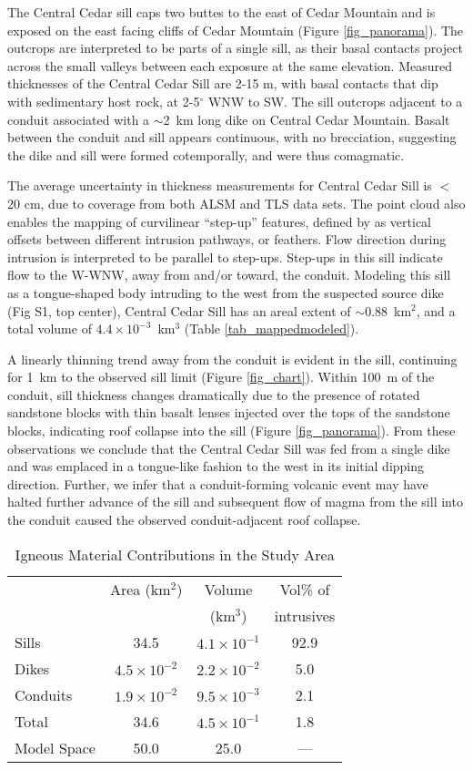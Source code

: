 The Central Cedar sill caps two buttes to the east of Cedar Mountain and is exposed on the east facing cliffs of Cedar Mountain (Figure \ref{fig_panorama}). The outcrops are interpreted to be parts of a single sill, as their basal contacts project across the small valleys between each exposure at the same elevation. Measured thicknesses of the Central Cedar Sill are 2-15 m, with basal contacts that dip with sedimentary host rock, at 2-5$^{\circ}$ WNW to SW. The sill outcrops adjacent to a conduit associated with a $\sim$2~km long dike on Central Cedar Mountain. Basalt between the conduit and sill appears continuous, with no brecciation, suggesting the dike and sill were formed cotemporally, and were thus comagmatic.

The average uncertainty in thickness measurements for Central Cedar Sill is $<$20 cm, due to coverage from both ALSM and TLS data sets. The point cloud also enables the mapping of curvilinear ``step-up'' features, defined by \citet{gartner1986geometry} as vertical offsets between different intrusion pathways, or feathers. Flow direction during intrusion is interpreted to be parallel to step-ups. Step-ups in this sill indicate flow to the W-WNW, away from and/or toward, the conduit. Modeling this sill as a tongue-shaped body intruding to the west from the suspected source dike (Fig S1, top center), Central Cedar Sill has an areal extent of $\sim$0.88~km$^2$, and a total volume of $4.4\times 10^{-3}$~km$^3$ (Table \ref{tab_mappedmodeled}).

A linearly thinning trend away from the conduit is evident in the sill, continuing for 1~km to the observed sill limit (Figure \ref{fig_chart}). Within 100~m of the conduit, sill thickness changes dramatically due to the presence of rotated sandstone blocks with thin basalt lenses injected over the tops of the sandstone blocks, indicating roof collapse into the sill (Figure \ref{fig_panorama}). From these observations we conclude that the Central Cedar Sill was fed from a single dike and was emplaced in a tongue-like fashion to the west in its initial dipping direction. Further, we infer that a conduit-forming volcanic event may have halted further advance of the sill and subsequent flow of magma from the sill into the conduit caused the observed conduit-adjacent roof collapse.

\begin{table}
\centering
\caption{Igneous Material Contributions in the Study Area}
\begin{tabular}{l c c c}
\toprule
 & Area (km$^2$) & Volume  & Vol\% of  \\
 & & (km$^3$) & intrusives \\
\midrule
 Sills & 34.5 & $4.1 \times 10^{-1}$ & 92.9 \\ 
 Dikes & $4.5 \times 10^{-2}$ & $2.2 \times 10^{-2}$ & 5.0 \\
 Conduits & $1.9 \times 10^{-2}$ & $9.5 \times 10^{-3}$ & 2.1 \\
 Total & 34.6 & $4.5 \times 10^{-1}$ & 1.8 \\
 Model Space & 50.0 & 25.0 & --- \\
\bottomrule
\end{tabular}
\label{tab_contribs}
\end{table}

